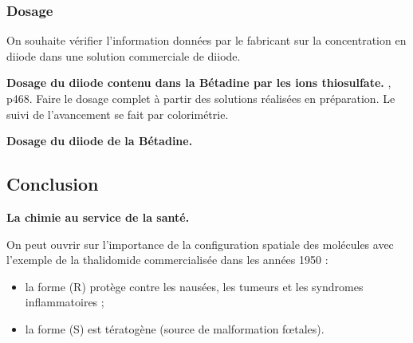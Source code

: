 \subsubsection{Dosage}

On souhaite vérifier l'information données par le fabricant sur la concentration en diiode dans une solution commerciale de diiode.

\begin{experience}
\textbf{Dosage du diiode contenu dans la Bétadine par les ions thiosulfate.}
\cite{Dulaurans2012}, p468.
Faire le dosage complet à partir des solutions réalisées en préparation.
Le suivi de l'avancement se fait par colorimétrie.
\end{experience}

\begin{slide}
\textbf{Dosage du diiode de la Bétadine.}
\end{slide}


\subsection{Conclusion}

\begin{slide}
\textbf{La chimie au service de la santé.}
\end{slide}

On peut ouvrir sur l'importance de la configuration spatiale des molécules avec l'exemple de la thalidomide commercialisée dans les années 1950 :
\begin{itemize}
\item la forme (R) protège contre les nausées, les tumeurs et les syndromes inflammatoires ;
\item la forme (S) est tératogène (source de malformation fœtales).
\end{itemize}

\newpage